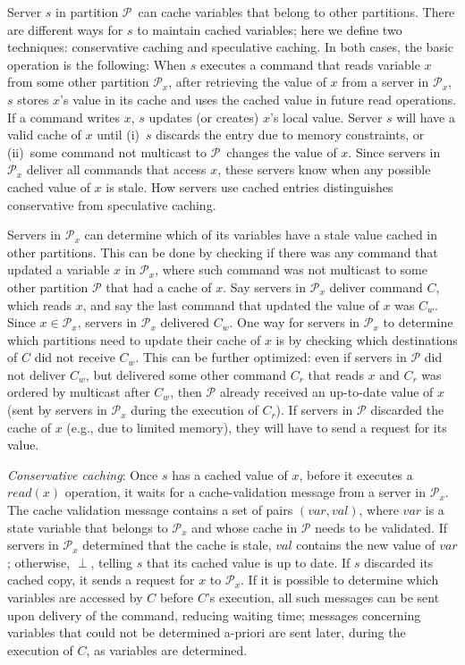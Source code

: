\documentclass[11pt]{article}
\newcommand{\pp}{$\mathcal{P}$}
\newcommand{\ppm}{\mathcal{P}}
\begin{document}
Server $s$ in partition \pp\ can cache variables that belong to other partitions.
There are different ways for $s$ to maintain cached variables; here we define two techniques: conservative caching and speculative caching.
In both cases, the basic operation is the following:
When $s$ executes a command that reads variable $x$ from some other partition $\ppm{}_x$, after retrieving the value of $x$ from a server in $\ppm{}_x$, $s$ stores $x$'s value in its cache and uses the cached value in future read operations.
If a command writes $x$, $s$ updates (or creates) $x$'s local value.
Server $s$ will have a valid cache of $x$ until (i)~$s$ discards the entry due to memory constraints, or (ii)~some command not multicast to \pp\ changes the value of $x$.
Since servers in $\ppm_x$ deliver all commands that access $x$, these servers know when any possible cached value of $x$ is stale.
How servers use cached entries distinguishes conservative from speculative caching.


Servers in $\ppm_x$ can determine which of its variables have a stale value cached in other partitions. This can be done by checking if there was any command that updated a variable $x$ in $\ppm_x$, where such command was not multicast to some other partition $\ppm$ that had a cache of $x$. Say servers in $\ppm_x$ deliver command $C$, which reads $x$, and say the last command that updated the value of $x$ was $C_w$. Since $x \in \ppm_x$, servers in $\ppm_x$ delivered $C_w$. One way for servers in $\ppm_x$ to determine which partitions need to update their cache of $x$ is by checking which destinations of $C$ did not receive $C_w$. This can be further optimized: even if servers in $\ppm$ did not deliver $C_w$, but delivered some other command $C_r$ that reads $x$ and $C_r$ was ordered by multicast after $C_w$, then $\ppm$ already received an up-to-date value of $x$ (sent by servers in $\ppm_x$ during the execution of $C_r$). If servers in $\ppm$ discarded the cache of $x$ (e.g., due to limited memory), they will have to send a request for its value.


\emph{Conservative caching}: Once $s$ has a cached value of $x$, before it executes a $read(x)$ operation, it waits for a cache-validation message from a server in $\ppm_x$. The cache validation message contains a set of pairs $(var, val)$, where $var$ is a state variable that belongs to $\ppm_x$ and whose cache in $\ppm$ needs to be validated.
If servers in $\ppm_x$ determined that the cache is stale, $val$ contains the new value of $var$; otherwise, $\perp$, telling $s$ that its cached value is up to date.
If $s$ discarded its cached copy, it sends a request for $x$ to $\ppm_x$.
If it is possible to determine which variables are accessed by $C$ before $C$'s execution, all such messages can be sent upon delivery of the command, reducing waiting time; messages concerning variables that could not be determined a-priori are sent later, during the execution of $C$, as variables are determined.
\end{document}
